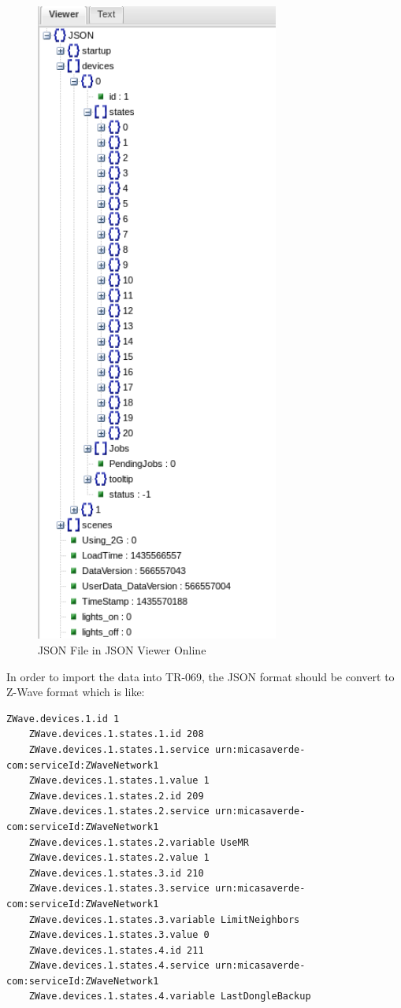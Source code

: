 \begin{figure}[htbp]
	\centering
		\includegraphics[width=8cm]{Figures/jsonviewer.png}
	\caption[JSON File in JSON Viewer Online]{JSON File in JSON Viewer Online}
\end{figure}

In order to import the data into TR-069, the JSON format should be convert to Z-Wave format which is like:
\begin{lstlisting}[mathescape]
    ZWave.devices.1.id 1
    ZWave.devices.1.states.1.id 208
    ZWave.devices.1.states.1.service urn:micasaverde-com:serviceId:ZWaveNetwork1
    ZWave.devices.1.states.1.value 1
    ZWave.devices.1.states.2.id 209
    ZWave.devices.1.states.2.service urn:micasaverde-com:serviceId:ZWaveNetwork1
    ZWave.devices.1.states.2.variable UseMR
    ZWave.devices.1.states.2.value 1
    ZWave.devices.1.states.3.id 210
    ZWave.devices.1.states.3.service urn:micasaverde-com:serviceId:ZWaveNetwork1
    ZWave.devices.1.states.3.variable LimitNeighbors
    ZWave.devices.1.states.3.value 0
    ZWave.devices.1.states.4.id 211
    ZWave.devices.1.states.4.service urn:micasaverde-com:serviceId:ZWaveNetwork1
    ZWave.devices.1.states.4.variable LastDongleBackup
\end{lstlisting}

